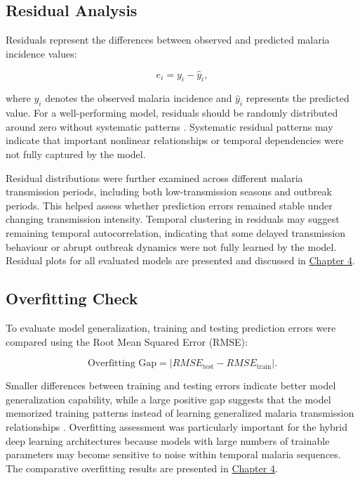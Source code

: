 	\subsection{Residual Analysis}
	
	Residuals represent the differences between observed and predicted malaria incidence values:
	
	\[
	e_i = y_i - \hat{y}_i,
	\]
	
	where \(y_i\) denotes the observed malaria incidence and \(\hat{y}_i\) represents the predicted value. For a well-performing model, residuals should be randomly distributed around zero without systematic patterns \cite{Hastie2009}. Systematic residual patterns may indicate that important nonlinear relationships or temporal dependencies were not fully captured by the model.
	
	Residual distributions were further examined across different malaria transmission periods, including both low-transmission seasons and outbreak periods. This helped assess whether prediction errors remained stable under changing transmission intensity. Temporal clustering in residuals may suggest remaining temporal autocorrelation, indicating that some delayed transmission behaviour or abrupt outbreak dynamics were not fully learned by the model. Residual plots for all evaluated models are presented and discussed in \hyperref[ch:results]{Chapter 4}.
	
	\subsection{Overfitting Check}
	
	To evaluate model generalization, training and testing prediction errors were compared using the Root Mean Squared Error (RMSE):
	
	\[
	\text{Overfitting Gap} = |RMSE_{\text{test}} - RMSE_{\text{train}}|.
	\]
	
	Smaller differences between training and testing errors indicate better model generalization capability, while a large positive gap suggests that the model memorized training patterns instead of learning generalized malaria transmission relationships \cite{Hastie2009}. Overfitting assessment was particularly important for the hybrid deep learning architectures because models with large numbers of trainable parameters may become sensitive to noise within temporal malaria sequences. The comparative overfitting results are presented in \hyperref[ch:results]{Chapter 4}.
	
